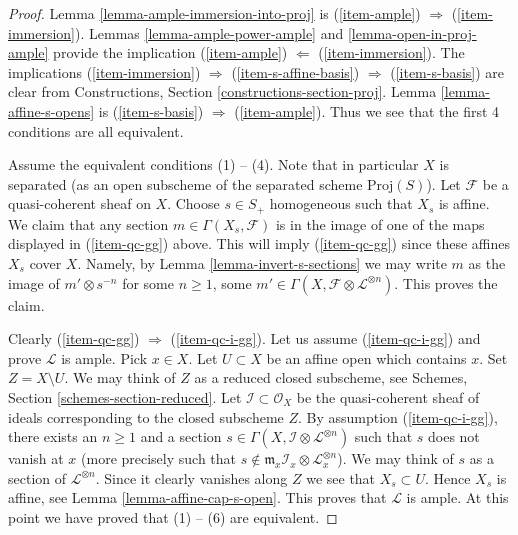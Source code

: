 \begin{proof}
Lemma \ref{lemma-ample-immersion-into-proj} is
(\ref{item-ample}) $\Rightarrow$ (\ref{item-immersion}).
Lemmas \ref{lemma-ample-power-ample} and \ref{lemma-open-in-proj-ample}
provide the implication
(\ref{item-ample}) $\Leftarrow$ (\ref{item-immersion}).
The implications (\ref{item-immersion}) $\Rightarrow$
(\ref{item-s-affine-basis}) $\Rightarrow$ (\ref{item-s-basis})
are clear from Constructions, Section \ref{constructions-section-proj}.
Lemma \ref{lemma-affine-s-opens} is
(\ref{item-s-basis}) $\Rightarrow$ (\ref{item-ample}).
Thus we see that the first 4 conditions are all equivalent.

\medskip\noindent
Assume the equivalent conditions (1) -- (4).
Note that in particular $X$ is separated (as an open
subscheme of the separated scheme $\text{Proj}(S)$).
Let $\mathcal{F}$ be a quasi-coherent sheaf on $X$.
Choose $s \in S_{+}$ homogeneous such that $X_s$ is affine.
We claim that any section $m \in \Gamma(X_s, \mathcal{F})$
is in the image of one of the maps displayed in
(\ref{item-qc-gg}) above. This will imply (\ref{item-qc-gg})
since these affines $X_s$ cover $X$.
Namely, by Lemma \ref{lemma-invert-s-sections} we may write
$m$ as the image of $m' \otimes s^{-n}$ for some
$n \geq 1$, some
$m' \in \Gamma(X, \mathcal{F} \otimes \mathcal{L}^{\otimes n})$.
This proves the claim.

\medskip\noindent
Clearly (\ref{item-qc-gg}) $\Rightarrow$ (\ref{item-qc-i-gg}).
Let us assume (\ref{item-qc-i-gg}) and prove $\mathcal{L}$ is
ample. Pick $x \in X$. Let $U \subset X$ be an affine open
which contains $x$. Set $Z = X \setminus U$. We may think of
$Z$ as a reduced closed subscheme, see
Schemes, Section \ref{schemes-section-reduced}.
Let $\mathcal{I} \subset \mathcal{O}_X$ be the quasi-coherent
sheaf of ideals corresponding to the closed subscheme $Z$.
By assumption (\ref{item-qc-i-gg}), there exists an $n \geq 1$ and a section
$s \in \Gamma(X, \mathcal{I} \otimes \mathcal{L}^{\otimes n})$
such that $s$ does not vanish at $x$ (more precisely such that
$s \not \in \mathfrak m_x \mathcal{I}_x \otimes \mathcal{L}_x^{\otimes n}$).
We may think of $s$ as a section of $\mathcal{L}^{\otimes n}$.
Since it clearly vanishes along $Z$ we see that
$X_s \subset U$. Hence $X_s$ is affine, see
Lemma \ref{lemma-affine-cap-s-open}.
This proves that $\mathcal{L}$ is ample.
At this point we have proved that (1) -- (6) are equivalent.


\end{proof}
